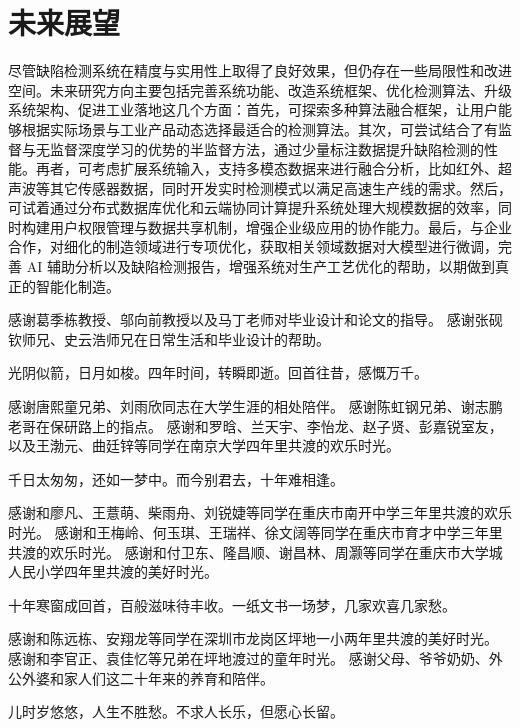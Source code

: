 \documentclass[
  ]{njuthesis}
\begin{document}
\section{未来展望}

尽管缺陷检测系统在精度与实用性上取得了良好效果，但仍存在一些局限性和改进空间。未来研究方向主要包括完善系统功能、改造系统框架、优化检测算法、升级系统架构、促进工业落地这几个方面：首先，可探索多种算法融合框架，让用户能够根据实际场景与工业产品动态选择最适合的检测算法。其次，可尝试结合了有监督与无监督深度学习的优势的半监督方法，通过少量标注数据提升缺陷检测的性能。再者，可考虑扩展系统输入，支持多模态数据来进行融合分析，比如红外、超声波等其它传感器数据，同时开发实时检测模式以满足高速生产线的需求。然后，可试着通过分布式数据库优化和云端协同计算提升系统处理大规模数据的效率，同时构建用户权限管理与数据共享机制，增强企业级应用的协作能力。最后，与企业合作，对细化的制造领域进行专项优化，获取相关领域数据对大模型进行微调，完善 AI 辅助分析以及缺陷检测报告，增强系统对生产工艺优化的帮助，以期做到真正的智能化制造。


\printbibliography


\begin{acknowledgement}
    
    感谢葛季栋教授、邬向前教授以及马丁老师对毕业设计和论文的指导。
    感谢张砚钦师兄、史云浩师兄在日常生活和毕业设计的帮助。
    
    光阴似箭，日月如梭。四年时间，转瞬即逝。回首往昔，感慨万千。
    
    感谢唐熙童兄弟、刘雨欣同志在大学生涯的相处陪伴。
    感谢陈虹钢兄弟、谢志鹏老哥在保研路上的指点。
    感谢和罗晗、兰天宇、李怡龙、赵子贤、彭嘉锐室友，以及王渤元、曲廷锌等同学在南京大学四年里共渡的欢乐时光。
    
    千日太匆匆，还如一梦中。而今别君去，十年难相逢。
    
    感谢和廖凡、王薏萌、柴雨舟、刘锐婕等同学在重庆市南开中学三年里共渡的欢乐时光。
    感谢和王梅岭、何玉琪、王瑞祥、徐文阔等同学在重庆市育才中学三年里共渡的欢乐时光。
    感谢和付卫东、隆昌顺、谢昌林、周灏等同学在重庆市大学城人民小学四年里共渡的美好时光。
    
    十年寒窗成回首，百般滋味待丰收。一纸文书一场梦，几家欢喜几家愁。
    
    感谢和陈远栋、安翔龙等同学在深圳市龙岗区坪地一小两年里共渡的美好时光。
    感谢和李官正、袁佳忆等兄弟在坪地渡过的童年时光。
    感谢父母、爷爷奶奶、外公外婆和家人们这二十年来的养育和陪伴。
    
    儿时岁悠悠，人生不胜愁。不求人长乐，但愿心长留。

\end{acknowledgement}
\end{document}
